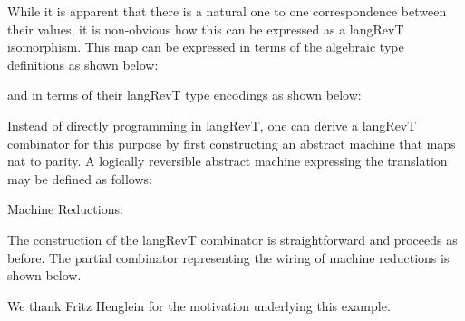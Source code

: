\documentclass{llncs}
\begin{document}
While it is apparent that there is a natural one to one correspondence
between their values, it is non-obvious how this can be expressed as a
{{langRevT}} isomorphism. This map can be expressed in terms of the
algebraic type definitions as shown below:


\indent
and in terms of their {{langRevT}} type encodings as shown below:


\noindent
Instead of directly programming in {{langRevT}}, one can derive a
{{langRevT}} combinator for this purpose by first constructing an
abstract machine that maps {{nat}} to {{parity}}.  A logically
reversible abstract machine expressing the translation may be defined
as follows:


\noindent
Machine Reductions:

The construction of the {{langRevT}} combinator is straightforward and
proceeds as before. The partial combinator representing the wiring of
machine reductions is shown below.

\begin{center}
\end{center}

\noindent
We thank Fritz Henglein for the motivation underlying this example.

\end{document}
